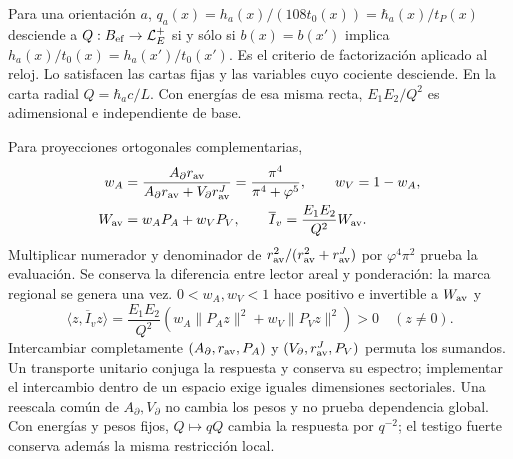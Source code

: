 Para una orientación $a$,
$q_a(x)=h_a(x)/(108t_0(x))=\hbar_a(x)/t_P(x)$
desciende a $Q:B_{\rm ef}\to\mathcal L_E^+$
si y sólo si $b(x)=b(x')$ implica
$h_a(x)/t_0(x)=h_a(x')/t_0(x')$.
Es el criterio de factorización aplicado al reloj.
Lo satisfacen las cartas fijas y las variables cuyo cociente
desciende. En la carta radial $Q=\hbar_ac/L$.
Con energías de esa misma recta, $E_1E_2/Q^2$ es adimensional
e independiente de base.

Para proyecciones ortogonales complementarias,
\begin{align}
w_A&=\frac{A_\partial r_{\rm av}}
{A_\partial r_{\rm av}+V_\partial r_{\rm av}^J}
=\frac{\pi^4}{\pi^4+\varphi^5},\qquad w_V=1-w_A,
\label{hmtcuatro:gea:pesos}\\
W_{\rm av}&=w_AP_A+w_VP_V,\qquad
\overline I_v=\frac{E_1E_2}{Q^2}W_{\rm av}.
\label{hmtcuatro:gea:respuesta}
\end{align}
Multiplicar numerador y denominador de
$r_{\rm av}^2/(r_{\rm av}^2+r_{\rm av}^J)$ por
$\varphi^4\pi^2$ prueba la evaluación.
Se conserva la diferencia entre lector areal y ponderación:
la marca regional se genera una vez.
$0<w_A,w_V<1$ hace positivo e invertible a $W_{\rm av}$ y
\[
\langle z,\overline I_vz\rangle
=\frac{E_1E_2}{Q^2}
(w_A\|P_Az\|^2+w_V\|P_Vz\|^2)>0\quad(z\ne0).
\]
Intercambiar completamente
$(A_\partial,r_{\rm av},P_A)$ y
$(V_\partial,r_{\rm av}^J,P_V)$ permuta los sumandos.
Un transporte unitario conjuga la respuesta y conserva su espectro;
implementar el intercambio dentro de un espacio exige iguales
dimensiones sectoriales.
Una reescala común de $A_\partial,V_\partial$ no cambia los pesos
y no prueba dependencia global.
Con energías y pesos fijos, $Q\mapsto qQ$ cambia la respuesta
por $q^{-2}$; el testigo fuerte conserva además la misma
restricción local.

